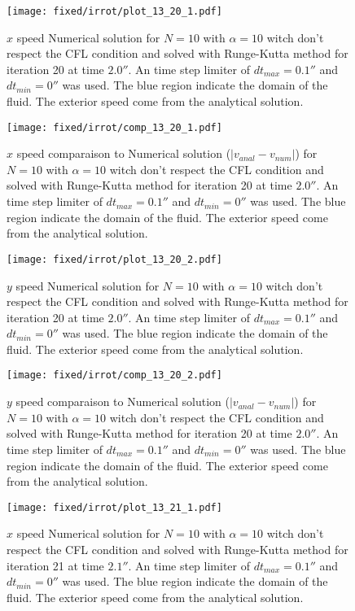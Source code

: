 \begin{figure}
\texttt{[image: fixed/irrot/plot\_13\_20\_1.pdf]}
\caption{$x$ speed Numerical solution for $N=10$ with $\alpha=10$ witch don't respect the CFL condition and solved with Runge-Kutta method
for iteration 20 at time $\unit{2.0}{\second}$.
An time step limiter of $dt_{max}=\unit{0.1}{\second}$ and $dt_{min}=\unit{0}{\second}$ was used.
The blue region indicate the domain of the fluid. The exterior speed come from the analytical solution.
\label{fix:plot_13_20_1}
}
\end{figure}

\begin{figure}
\texttt{[image: fixed/irrot/comp\_13\_20\_1.pdf]}
\caption{$x$ speed comparaison to Numerical solution ($|v_{anal}-v_{num}|$) for $N=10$ with $\alpha=10$ witch don't respect the CFL condition and solved with Runge-Kutta method
for iteration 20 at time $\unit{2.0}{\second}$.
An time step limiter of $dt_{max}=\unit{0.1}{\second}$ and $dt_{min}=\unit{0}{\second}$ was used.
The blue region indicate the domain of the fluid. The exterior speed come from the analytical solution.
\label{fix:comp_13_20_1}
}
\end{figure}
\begin{figure}
\texttt{[image: fixed/irrot/plot\_13\_20\_2.pdf]}
\caption{$y$ speed Numerical solution for $N=10$ with $\alpha=10$ witch don't respect the CFL condition and solved with Runge-Kutta method
for iteration 20 at time $\unit{2.0}{\second}$.
An time step limiter of $dt_{max}=\unit{0.1}{\second}$ and $dt_{min}=\unit{0}{\second}$ was used.
The blue region indicate the domain of the fluid. The exterior speed come from the analytical solution.
\label{fix:plot_13_20_2}
}
\end{figure}

\begin{figure}
\texttt{[image: fixed/irrot/comp\_13\_20\_2.pdf]}
\caption{$y$ speed comparaison to Numerical solution ($|v_{anal}-v_{num}|$) for $N=10$ with $\alpha=10$ witch don't respect the CFL condition and solved with Runge-Kutta method
for iteration 20 at time $\unit{2.0}{\second}$.
An time step limiter of $dt_{max}=\unit{0.1}{\second}$ and $dt_{min}=\unit{0}{\second}$ was used.
The blue region indicate the domain of the fluid. The exterior speed come from the analytical solution.
\label{fix:comp_13_20_2}
}
\end{figure}

\begin{figure}
\texttt{[image: fixed/irrot/plot\_13\_21\_1.pdf]}
\caption{$x$ speed Numerical solution for $N=10$ with $\alpha=10$ witch don't respect the CFL condition and solved with Runge-Kutta method
for iteration 21 at time $\unit{2.1}{\second}$.
An time step limiter of $dt_{max}=\unit{0.1}{\second}$ and $dt_{min}=\unit{0}{\second}$ was used.
The blue region indicate the domain of the fluid. The exterior speed come from the analytical solution.
\label{fix:plot_13_21_1}
}
\end{figure}

